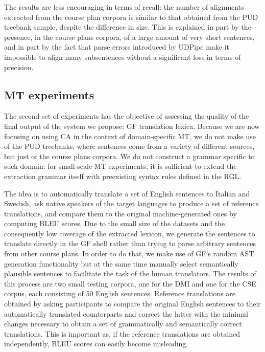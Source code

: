 \documentclass[11pt]{article}
\begin{document}
The results are less encouraging in terms of recall: the number of alignments extracted from the course plan corpora is similar to that obtained from the PUD treebank sample, despite the difference in size. 
This is explained in part by the presence, in the course plans corpora, of a large amount of very short sentences, and in part by the fact that parse errors introduced by UDPipe make it impossible to align many subsentences without a significant loss in terms of precision.  

\subsection{MT experiments} \label{mtexp}
The second set of experiments has the objective of assessing the quality of the final output of the system we propose: GF translation lexica. 
Because we are now focusing on using CA in the context of domain-specific MT, we do not make use of the PUD treebanks, where sentences come from a variety of different sources, but just of the course plans corpora. 
We do not construct a grammar specific to such domain: for small-scale MT experiments, it is sufficient to extend the extraction grammar itself with preexisting syntax rules defined in the RGL. 

The idea is to automatically translate a set of English sentences to Italian and Swedish, ask native speakers of the target languages to produce a set of reference translations, and compare them to the original machine-generated ones by computing BLEU scores.
Due to the small size of the datasets and the consequently low coverage of the extracted lexicon, we generate the sentences to translate directly in the GF shell rather than trying to parse arbitrary sentences from other course plans. 
In order to do that, we make use of GF's random AST generation functionality but at the same time manually select semantically plausible sentences to facilitate the task of the human translators.
The results of this process are two small testing corpora, one for the DMI and one for the CSE corpus, each consisting of 50 English sentences. 
Reference translations are obtained by asking participants to compare the original English sentences to their automatically translated counterparts and correct the latter with the minimal changes necessary to obtain a set of grammatically and semantically correct translations. 
This is important as, if the reference translations are obtained independently, BLEU scores can easily become misleading.
\end{document}

